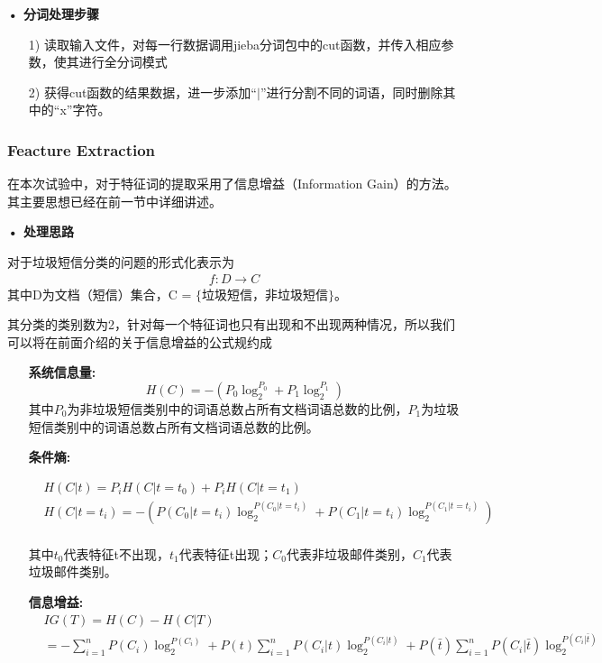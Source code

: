 \documentclass[a4paper,11pt,twoside,openany]{article}
\begin{document}
\begin{CJK*}{UTF8}{gbsn}
\textbf{• 分词处理步骤}

\begin{enumerate}
\item[1)] 读取输入文件，对每一行数据调用jieba分词包中的cut函数，并传入相应参数，使其进行全分词模式
\item[2)] 获得cut函数的结果数据，进一步添加“$|$”进行分割不同的词语，同时删除其中的“x”字符。
\end{enumerate}   
    
\subsubsection{Feacture Extraction}
在本次试验中，对于特征词的提取采用了信息增益（Information Gain）的方法。其主要思想已经在前一节中详细讲述。

\textbf{• 处理思路}

对于垃圾短信分类的问题的形式化表示为
\begin{eqnarray}
	f: D \rightarrow C 
\end{eqnarray}	
其中D为文档（短信）集合，C = $\{$垃圾短信，非垃圾短信$\}$。

其分类的类别数为2，针对每一个特征词也只有出现和不出现两种情况，所以我们可以将在前面介绍的关于信息增益的公式规约成 \\
\begin{enumerate}
\item[] \textbf{系统信息量:} 
\begin{equation}\label{classify-etropy}
	H(C) = - (P_0\log_2^{P_0} + P_1\log_2^{P_1})
\end{equation}
其中$P_0$为非垃圾短信类别中的词语总数占所有文档词语总数的比例，$P_1$为垃圾短信类别中的词语总数占所有文档词语总数的比例。
\item[] \textbf{条件熵:}  

\begin{equation}\label{classify-condition-etropy}
\begin{split}
&	H(C|t) =  P_i H(C|t = t_0)+P_i H(C|t = t_1) \\
&	H(C|t=t_i) = -(P(C_0|t=t_i)\log_2^{P(C_0|t=t_i)} + P(C_1|t=t_i)\log_2^{P(C_1|t=t_i)})\\
\end{split}
\end{equation}

其中$t_0$代表特征t不出现，$t_1$代表特征t出现；$C_0$代表非垃圾邮件类别，$C_1$代表垃圾邮件类别。
\item[] \textbf{信息增益:} 
\begin{equation}\label{classify-IG}
\begin{split}
&	IG(T) = H(C) - H(C|T) \\ 
&	= - \sum_{i=1}^n P(C_i)\log_2^{P(C_i)}+P(t)\sum_{i=1}^nP(C_i|t)\log_2^{P(C_i|t)} + P(\bar{t})\sum_{i=1}^nP(C_i|\bar{t})\log_2^{P(C_i|\bar{t})}
\end{split}
\end{equation}
\end{enumerate}




\end{CJK*}
\end{document}
